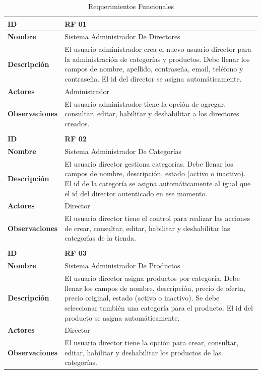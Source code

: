 \begin{center}
\begin{longtable}{p{3cm} p{12cm}}
\caption{Requerimientos Funcionales}
\label{table:Requerimientos-Funcionales}
\\ \hline \hline

\textbf{ID} & \textbf{RF 01} \\ \hline
\textbf{Nombre} & Sistema Administrador De Directores \\ \hline
\textbf{Descripción} & El usuario administrador crea el nuevo usuario director para la administración de categorías y productos. Debe llenar los campos de nombre, apellido, contraseña, email, teléfono y contraseña. El id del director se asigna automáticamente.  \\ \hline
\textbf{Actores} & Administrador \\ \hline
\textbf{Observaciones} & El usuario administrador tiene la opción de agregar, consultar, editar, habilitar y deshabilitar a los directores creados. \\ \hline
\hline \\ \hline \hline

\textbf{ID} & \textbf{RF 02} \\ \hline
\textbf{Nombre} & Sistema Administrador De Categorías \\ \hline
\textbf{Descripción} & El usuario director gestiona categorías. Debe llenar los campos de nombre, descripción, estado (activo o inactivo). El id de la categoría se asigna automáticamente al igual que el id del director autenticado en ese momento.  \\ \hline
\textbf{Actores} & Director \\ \hline
\textbf{Observaciones} & El usuario director tiene el control para realizar las acciones de crear, consultar, editar, habilitar y deshabilitar las categorías de la tienda. \\ \hline
\hline \\ \hline \hline

\textbf{ID} & \textbf{RF 03} \\ \hline
\textbf{Nombre} & Sistema Administrador De Productos \\ \hline
\textbf{Descripción} & El usuario director asigna productos por categoría. Debe llenar los campos de nombre, descripción, precio de oferta, precio original, estado (activo o inactivo). Se debe seleccionar también una categoría para el producto. El id del producto se asigna automáticamente.  \\ \hline
\textbf{Actores} & Director \\ \hline
\textbf{Observaciones} & El usuario director tiene la opción para crear, consultar, editar, habilitar y deshabilitar los productos de las categorías. \\ \hline
\hline
\end{longtable}
\end{center}


